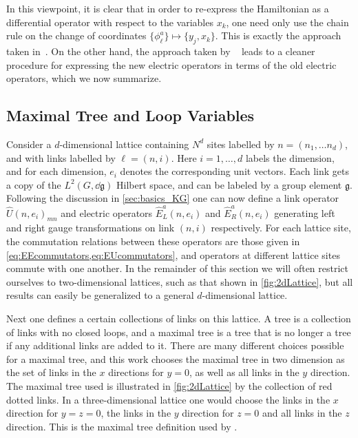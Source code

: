 \documentclass[reprint,superscriptaddress,pra,nofootinbib,preprintnumbers,floatfix]{revtex4-1}
\providecommand{\g}{{\mathfrak{g}}}
\begin{document}
In this viewpoint, it is clear that in order to re-express the Hamiltonian as a differential operator with respect to the variables $x_k$, one need only use the chain rule on the change of coordinates $\{\phi^a_\ell\} \mapsto \{y_j,x_k\}$. 
%
This is exactly the approach taken in~\cite{PhysRevD.31.2020, MULLER198449}.
%
On the other hand, the approach taken by ~\cite{Ligterink_2000} leads to a cleaner procedure for expressing the new electric operators in terms of the old electric operators, which we now summarize.


\subsection{Maximal Tree and Loop Variables}

Consider a $d$-dimensional lattice containing $N^d$ sites labelled by $n=(n_1, \ldots n_d)$, and with links labelled by $\ell=(n,i)$. Here  $i=1,\ldots, d$ labels the dimension, and for each dimension, $e_i$ denotes the corresponding unit vectors. 
%
Each link gets a copy of the $L^2(G,\dd\g)$ Hilbert space, and can be labeled by a group element $\g$. 
%
Following the discussion in \cref{sec:basics_KG} one can now define a link operator $\hat U(n,e_i)_{mn}$ and electric operators $\hat E^a_{L}(n,e_i)$ and $\hat E_R^a(n,e_i)$ generating left and right gauge transformations on link $(n,i)$ respectively. 
%
For each lattice site, the commutation relations between these operators are those given in \cref{eq:EEcommutators,eq:EUcommutators}, and operators at different lattice sites commute with one another.
%
In the remainder of this section we will often restrict ourselves to two-dimensional lattices, such as that shown in \cref{fig:2dLattice}, but all results can easily be generalized to a general $d$-dimensional lattice. 

Next one defines a certain collections of links on this lattice. A tree is a collection of links with no closed loops, and a maximal tree is a tree that is no longer a tree if any additional links are added to it. 
%
There are many different choices possible for a maximal tree, and this work chooses the maximal tree in two dimension as the set of links in the $x$ directions for $y =0$, as well as all links in the $y$ direction. 
%
The maximal tree used is illustrated in \cref{fig:2dLattice} by the collection of red dotted links. In a three-dimensional lattice one would choose the links in the $x$ direction for $y = z = 0$, the links in the $y$ direction for $z = 0$ and all links in the $z$ direction. 
%
This is the maximal tree definition used by \cite{MULLER198449, PhysRevD.31.2020, Ligterink_2000}. 
\end{document}
